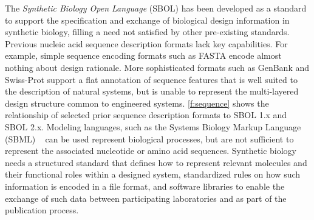 The \emph{Synthetic Biology Open Language} (SBOL) has been developed as a standard to support the specification and exchange of biological design information in synthetic biology, filling a need not satisfied by other pre-existing standards.
Previous nucleic acid sequence description formats lack key capabilities. For example,  simple sequence encoding formats such as FASTA encode almost nothing about design rationale. More sophisticated formats such as GenBank and Swiss-Prot support a flat annotation of sequence features that is well suited to the  description of natural systems, but is unable to represent the multi-layered design structure common to engineered systems.
\ref{f:sequence} shows the relationship of selected prior sequence description formats to SBOL 1.x and SBOL 2.x.
Modeling languages, such as the Systems Biology Markup Language (SBML) ~\cite{SBML} can be used represent biological processes, but are not sufficient to represent the associated nucleotide or amino acid sequences.  %
Synthetic biology needs a structured standard that defines how to represent relevant molecules and their functional roles within a designed system, standardized rules on how such information is encoded in a file format, and software libraries to enable the exchange of such data between participating laboratories and as part of the publication process. 

